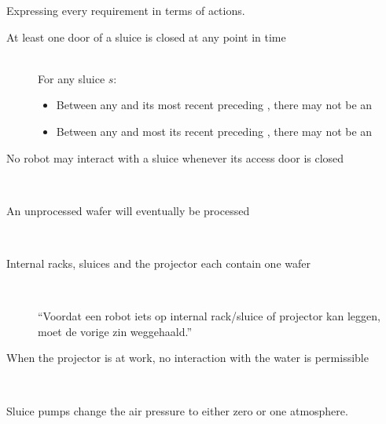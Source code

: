 
Expressing every requirement in terms of actions.

\begin{description}
 \item[At least one door of a sluice is closed at any point in time] \hfill \\
 For any sluice $s$:
 \begin{itemize}
  \item Between any  and its most recent preceding , there may not be an 
  \item Between any  and most its recent preceding , there may not be an 
 \end{itemize}

 \item[No robot may interact with a sluice whenever its access door is closed] \hfill \\
 
 \item[An unprocessed wafer will eventually be processed] \hfill \\
 
 \item[Internal racks, sluices and the projector each contain one wafer] \hfill \\
 
 ``Voordat een robot iets op internal rack/sluice of projector kan leggen, moet de vorige zin weggehaald.''
 
 \item[When the projector is at work, no interaction with the water is permissible] \hfill \\
 
 
 
 \item[Sluice pumps change the air pressure to either zero or one atmosphere.] \hfill \\
 

\end{description}
